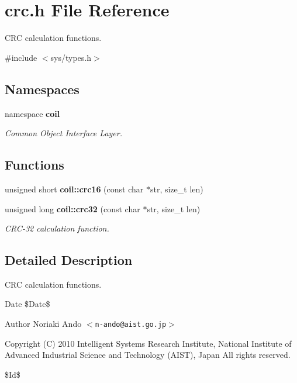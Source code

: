 \section{crc.h File Reference}
\label{crc_8h}


CRC calculation functions.  


{\ttfamily \#include $<$sys/types.h$>$}\par
\subsection*{Namespaces}
\begin{DoxyCompactItemize}
\item 
namespace {\bf coil}


\begin{DoxyCompactList}\small\item\em Common Object Interface Layer. \item\end{DoxyCompactList}

\end{DoxyCompactItemize}
\subsection*{Functions}
\begin{DoxyCompactItemize}
\item 
unsigned short {\bf coil::crc16} (const char $\ast$str, size\_\-t len)
\item 
unsigned long {\bf coil::crc32} (const char $\ast$str, size\_\-t len)
\begin{DoxyCompactList}\small\item\em CRC-\/32 calculation function. \item\end{DoxyCompactList}\end{DoxyCompactItemize}


\subsection{Detailed Description}
CRC calculation functions. \begin{DoxyDate}{Date}
\$Date\$ 
\end{DoxyDate}
\begin{DoxyAuthor}{Author}
Noriaki Ando $<${\tt n-\/ando@aist.go.jp}$>$
\end{DoxyAuthor}
Copyright (C) 2010 Intelligent Systems Research Institute, National Institute of Advanced Industrial Science and Technology (AIST), Japan All rights reserved.

\$Id\$ 
